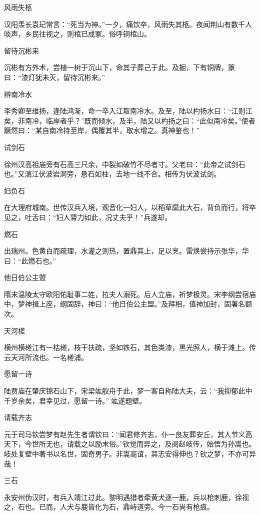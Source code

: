 \documentclass[a4paper,12pt,UTF8,twoside]{ctexbook}
\begin{document}
    风雨失柩
    
    汉阳羡长袁玘常言：“死当为神。”一夕，痛饮卒，风雨失其柩。夜闻荆山有数千人啖声，乡民往视之，则棺已成冢。俗呼铜棺山。
    
    留待沉彬来
    
    沉彬有方外术，尝植一树于沉山下，命其子葬己于此。及掘，下有铜牌，篆曰：“漆灯犹未灭，留待沉彬来。”
    
    辨南冷水
    
    李秀卿至维扬，逢陆鸿渐，命一卒入江取南冷水。及至，陆以杓扬水曰：“江则江矣，非南冷，临岸者乎？”既而倾水，及半，陆又以杓扬之曰：“此似南冷矣。”使者蹶然曰：“某自南冷持至岸，偶覆其半，取水增之。真神鉴也！”
    
    试剑石
    
    徐州汉高祖庙旁有石高三尺余，中裂如破竹不尽者寸。父老曰：“此帝之试剑石也。”又漓江伏波岩洞旁，悬石如柱，去地一线不合。相传为伏波试剑。
    
    妇负石
    
    在大理府城南。世传汉兵入境，观音化一妇人，以稻草縻此大石，背负而行，将卒见之，吐舌曰：“妇人膂力如此，况丈夫乎！”兵遂却。
    
    燃石
    
    出瑞州。色黄白而疏理，水灌之则热，置鼎其上，足以烹。雷焕尝持示张华，华曰：“此燃石也。”
    
    他日伯公主盟
    
    隋末温陵太守欧阳佑耻事二姓，拉夫人溺死。后人立庙，祈梦极灵。宋李纲尝宿庙中，梦神揖上座，纲固辞，神曰：“他日伯公主盟。”及拜相，值神加封，固署名额次。
    
    天河槎
    
    横州横槎江有一枯槎，枝干扶疏，坚如铁石，其色类漆，黑光照人，横于滩上。传云天河所流也。一名槎浦。
    
    愿留一诗
    
    陆贾庙在肇庆锦石山下，宋梁竑舣舟于此，梦一客自称陆大夫，云：“我抑郁此中千岁余矣，君幸见过，愿留一诗。” 竑遂题壁。
    
    请载齐志
    
    元于司马钦尝梦有赵先生者谓钦曰：“闻君修齐志，仆一良友葬安丘，其人节义高天下，今世所无也，请载之以励末俗。”钦觉而异之，及阅赵岐传，始悟为孙嵩也。岐处复壁中著书以名世，固奇男子。非嵩高谊，其志安得伸也？钦之梦，不亦可异哉！
    
    三石
    
    永安州伪汉时，有兵入靖江过此。黎明遇猎者牵黄犬逐一鹿，兵以枪刺鹿，徐视之，石也。已而，人犬与鹿皆化为石，鼎峙道旁。今一石尚有枪痕。
    
\end{document}
